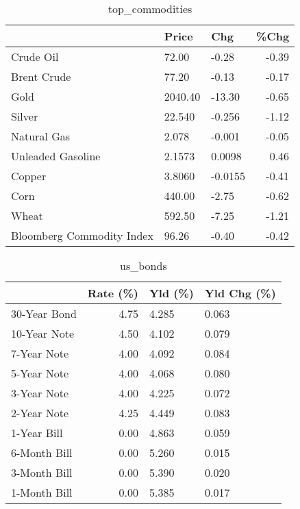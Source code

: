 \documentclass{article}%
\begin{document}
\begin{table}[htbp]%
\caption{top\_commodities}%
\centering%
\begin{adjustbox}{width=1\textwidth}%
\begin{tabular}{lllr}
\toprule
                          &   Price &     Chg &  \%Chg \\
\midrule
               Crude Oil  &   72.00 &   -0.28 & -0.39 \\
             Brent Crude  &   77.20 &   -0.13 & -0.17 \\
                    Gold  & 2040.40 &  -13.30 & -0.65 \\
                  Silver  &  22.540 &  -0.256 & -1.12 \\
             Natural Gas  &   2.078 &  -0.001 & -0.05 \\
       Unleaded Gasoline  &  2.1573 &  0.0098 &  0.46 \\
                  Copper  &  3.8060 & -0.0155 & -0.41 \\
                    Corn  &  440.00 &   -2.75 & -0.62 \\
                   Wheat  &  592.50 &   -7.25 & -1.21 \\
Bloomberg Commodity Index &   96.26 &   -0.40 & -0.42 \\
\bottomrule
\end{tabular}
%
\end{adjustbox}%
\end{table}

%


\begin{table}[htbp]%
\caption{us\_bonds}%
\centering%
\begin{adjustbox}{width=1\textwidth}%
\begin{tabular}{lrll}
\toprule
             &  Rate (\%) & Yld (\%) & Yld Chg (\%) \\
\midrule
30-Year Bond &      4.75 &   4.285 &       0.063 \\
10-Year Note &      4.50 &   4.102 &       0.079 \\
 7-Year Note &      4.00 &   4.092 &       0.084 \\
 5-Year Note &      4.00 &   4.068 &       0.080 \\
 3-Year Note &      4.00 &   4.225 &       0.072 \\
 2-Year Note &      4.25 &   4.449 &       0.083 \\
 1-Year Bill &      0.00 &   4.863 &       0.059 \\
6-Month Bill &      0.00 &   5.260 &       0.015 \\
3-Month Bill &      0.00 &   5.390 &       0.020 \\
1-Month Bill &      0.00 &   5.385 &       0.017 \\
\bottomrule
\end{tabular}
%
\end{adjustbox}%
\end{table}
\end{document}
